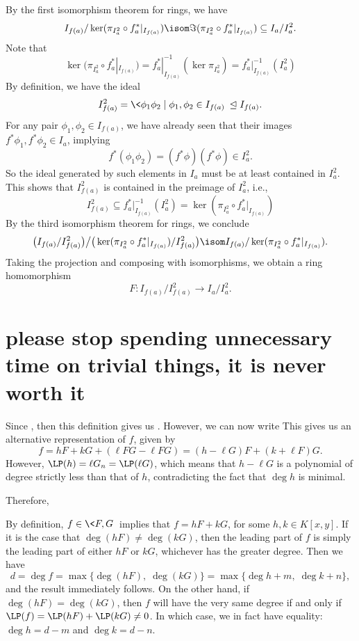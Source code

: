 \documentclass[12pt]{article}
\let\teq\trianglelefteq
\begin{document}
By the first isomorphism theorem for rings, we have
\[
    I_{f(a)}/\ker(\pi_{I_a^2} \circ f^*_a|_{I_{f(a)}}) \isom \Im(\pi_{I_a^2} \circ f^*_a|_{I_{f(a)}}) \subseteq I_a/I_a^2.
\]
Note that
\[
    \ker(\pi_{I_a^2} \circ f^*_a|_{I_{f(a)}})
        = f^*_a|_{I_{f(a)}}^{-1}(\ker \pi_{I_a^2})
        = f^*_a|_{I_{f(a)}}^{-1}(I_a^2)
\]
By definition, we have the ideal
\[
    I_{f(a)}^2 = \<\phi_1\phi_2 \mid \phi_1, \phi_2 \in I_{f(a)}\> \teq I_{f(a)}.
\]
For any pair $\phi_1, \phi_2 \in I_{f(a)}$, we have already seen that their images $f^*\phi_1, f^*\phi_2 \in I_a$, implying
\[
    f^*(\phi_1\phi_2) = (f^*\phi)(f^*\phi) \in I_a^2.
\]
So the ideal generated by such elements in $I_a$ must be at least contained in $I_a^2$. This shows that $I_{f(a)}^2$ is contained in the preimage of $I_a^2$, i.e.,
\[
    I_{f(a)}^2 \subseteq f^*_a|_{I_{f(a)}}^{-1}(I_a^2) = \ker(\pi_{I_a^2} \circ f^*_a|_{I_{f(a)}})
\]
By the third isomorphism theorem for rings, we conclude
\[
    \big(I_{f(a)}/I_{f(a)}^2\big) \big/ \big(\ker(\pi_{I_a^2} \circ f^*_a|_{I_{f(a)}})/I_{f(a)}^2\big) 
    \isom I_{f(a)}/\ker(\pi_{I_a^2} \circ f^*_a|_{I_{f(a)}}).
\]
Taking the projection and composing with isomorphisms, we obtain a ring homomorphism
\[
    F : I_{f(a)}/I_{f(a)}^2 \to I_a/I_a^2.
\]



\section{please stop spending unnecessary time on trivial things, it is never worth it}

Since , then this definition gives us . However, we can now write
    This gives us an alternative representation of $f$, given by
    \[
        f
            = hF + kG + (\ell FG - \ell FG)
            = (h - \ell G)F + (k + \ell F)G.
    \]
    However, $\LP(h) = \ell G_n = \LP(\ell G)$, which means that $h - \ell G$ is a polynomial of degree strictly less than that of $h$, contradicting the fact that $\deg h$ is minimal.


    Therefore, 








    By definition, $f \in \<F, G\>$ implies that $f = hF + kG$, for some $h, k \in K[x, y]$. If it is the case that $\deg(hF) \ne \deg(kG)$, then the leading part of $f$ is simply the leading part of either $hF$ or $kG$, whichever has the greater degree. Then we have
    \[
        d 
            = \deg f
            = \max\{\deg(hF),\; \deg(kG)\}
            = \max\{\deg h + m,\; \deg k + n\},
    \]
    and the result immediately follows. On the other hand, if $\deg(hF) = \deg(kG)$, then $f$ will have the very same degree if and only if $\LP(f) = \LP(hF) + \LP(kG) \ne 0$. In which case, we in fact have equality: $\deg h = d - m$ and $\deg k = d - n$.
\end{document}
